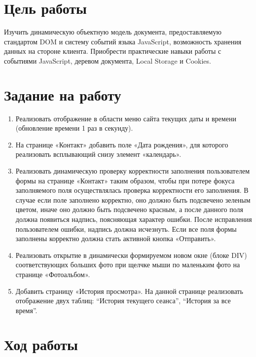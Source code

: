 \documentclass[a4paper,14pt]{extarticle}
\begin{document}


\section{Цель работы}
Изучить динамическую объектную модель документа, предоставляемую
стандартом DOM и систему событий языка JavaScript, возможность
хранения данных на стороне клиента. Приобрести практические навыки
работы с событиями JavaScript, деревом документа, Local Storage и
Cookies.

\section{Задание на работу}
\begin{enumerate}
    \item Реализовать отображение в области меню сайта текущих даты и
          времени (обновление времени 1 раз в секунду). 
    \item На странице «Контакт» добавить поле «Дата рождения», для
          которого реализовать всплывающий снизу элемент «календарь».
    \item Реализовать динамическую проверку корректности заполнения
          пользователем формы на странице «Контакт» таким образом, чтобы при
          потере фокуса заполняемого поля осуществлялась проверка корректности
          его заполнения. В случае если поле заполнено корректно, оно должно быть
          подсвечено зеленым цветом, иначе оно должно быть подсвечено красным,
          а после данного поля должна появиться надпись, поясняющая характер
          ошибки. После исправления пользователем ошибки, надпись должна исчезнуть. Если все поля формы заполнены корректно должна стать активной кнопка «Отправить».
    \item Реализовать открытие в динамически формируемом новом окне
          (блоке DIV) соответствующих больших фото при щелчке мыши
          по маленьким фото на странице «Фотоальбом».
    \item Добавить страницу «История просмотра». На данной странице
          реализовать отображение двух таблиц: \enquote{История текущего сеанса},
          \enquote{История за все время}.
\end{enumerate}

\section{Ход работы}
\end{document}
